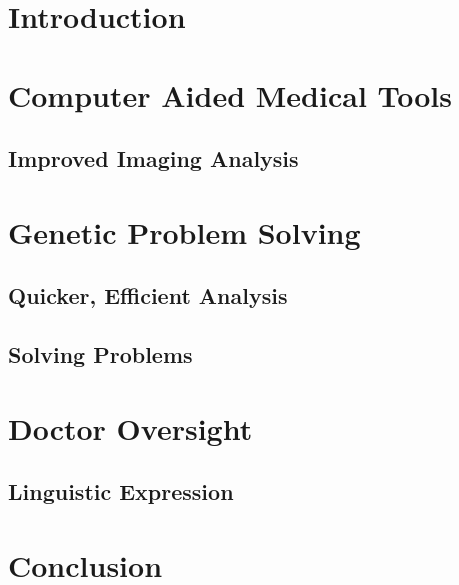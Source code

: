 \documentclass[11pt]{article}
\begin{document}
\begin{doublespace}
\section{Introduction}

\section{Computer Aided Medical Tools}

\subsection{Improved Imaging Analysis}

\section{Genetic Problem Solving}

\subsection{Quicker, Efficient Analysis}

\subsection{Solving Problems}

\section{Doctor Oversight}

\subsection{Linguistic Expression}

\section{Conclusion}


\pagebreak


\end{doublespace}

\nocite{*}



\end{document}
